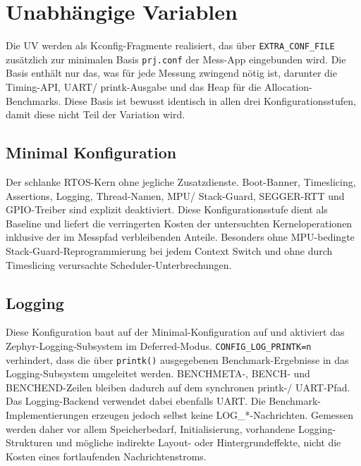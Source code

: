 \section{Unabh{\"a}ngige Variablen}
Die UV werden als Kconfig-Fragmente realisiert, das {\"u}ber \lstinline[style=codeinline]|EXTRA_CONF_FILE| zus{\"a}tzlich zur minimalen Basis \lstinline[style=codeinline]|prj.conf| der Mess-App eingebunden wird. Die Basis enth{\"a}lt nur das, was f{\"u}r jede Messung zwingend n{\"o}tig ist, darunter die Timing-API, UART/ printk-Ausgabe und das Heap f{\"u}r die Allocation-Benchmarks. Diese Basis ist bewusst identisch in allen drei Konfigurationsstufen, damit diese nicht Teil der Variation wird.

\subsection{Minimal Konfiguration}
Der schlanke RTOS-Kern ohne jegliche Zusatzdienste. Boot-Banner, Timeslicing, Assertions, Logging, Thread-Namen, MPU/ Stack-Guard, SEGGER-RTT und GPIO-Treiber sind explizit deaktiviert. Diese Konfigurationsstufe dient als Baseline und liefert die verringerten Kosten der untersuchten Kerneloperationen inklusive der im Messpfad verbleibenden Anteile. Besonders ohne MPU-bedingte Stack-Guard-Reprogrammierung bei jedem Context Switch und ohne durch Timeslicing verursachte Scheduler-Unterbrechungen.

\subsection{Logging}
Diese Konfiguration baut auf der Minimal-Konfiguration auf und aktiviert das Zephyr-Logging-Subsystem im Deferred-Modus. \lstinline[style=codeinline]|CONFIG_LOG_PRINTK=n| verhindert, dass die {\"u}ber \lstinline[style=codeinline]|printk()| ausgegebenen Benchmark-Ergebnisse in das Logging-Subsystem umgeleitet werden. BENCHMETA-, BENCH- und BENCHEND-Zeilen bleiben dadurch auf dem synchronen printk-/ UART-Pfad. Das Logging-Backend verwendet dabei ebenfalls UART. Die Benchmark-Implementierungen erzeugen jedoch selbst keine LOG\_*-Nachrichten. Gemessen werden daher vor allem Speicherbedarf, Initialisierung, vorhandene Logging-Strukturen und m{\"o}gliche indirekte Layout- oder Hintergrundeffekte, nicht die Kosten eines fortlaufenden Nachrichtenstroms.

